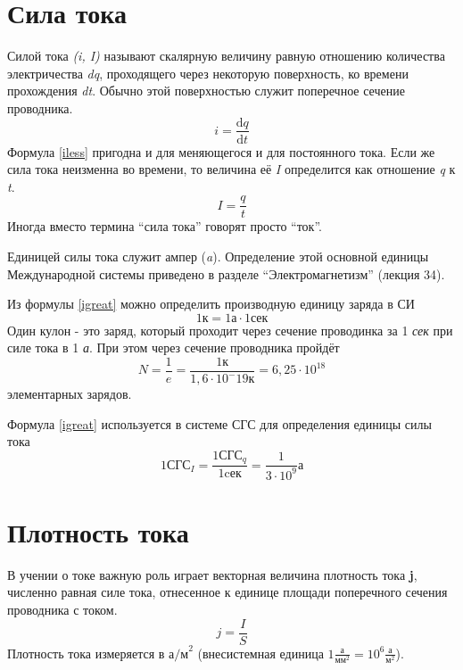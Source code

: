 \documentclass[a4paper,10pt]{book}
\begin{document}
\section{Сила тока}
Силой тока \emph{(i, I)} называют скалярную величину равную отношению количества электричества \emph{dq}, проходящего через некоторую
поверхность, ко времени прохождения \emph{dt}. Обычно этой поверхностью служит поперечное сечение проводника.
\begin{equation}\label{iless}
 i = \frac{\mathrm{d}q}{\mathrm{d}t}
\end{equation}
Формула \ref{iless} пригодна и для меняющегося и для постоянного тока. Если же сила тока неизменна во времени, то величина её \emph{I}
определится как отношение \emph{q} к \emph{t}.
\begin{equation}\label{igreat}
 I = \frac{q}{t}
\end{equation}
Иногда вместо термина ``сила тока'' говорят просто ``ток''.

Единицей силы тока служит ампер (\emph{a}). Определение этой основной единицы Международной системы приведено в разделе ``Электромагнетизм''
(лекция 34).

Из формулы \ref{igreat} можно определить производную единицу заряда в СИ
\begin{equation}
 1 \text{к} = 1 \text{а} \cdot 1 \text{сек} \nonumber
\end{equation}
Один кулон - это заряд, который проходит через сечение проводинка за 1 \emph{сек} при силе тока в 1 \emph{а}. При этом через сечение проводника
пройдёт 
\begin{equation}
 N = \frac{1}{e} = \frac{1 \text{к}}{1,6 \cdot 10^-19 \text{к}} = 6,25 \cdot 10^18 \nonumber
\end{equation}
элементарных зарядов.

Формула \ref{igreat} используется в системе СГС для определения единицы силы тока
\begin{equation}\label{sgsamp}
  1\text{СГС}_I = \frac{1\text{СГС}_q}{1 \text{cек}} = \frac{1}{3 \cdot 10^9} \text{а}
\end{equation}
\section{Плотность тока}
В учении о токе важную роль играет векторная величина плотность тока \textbf{j}, численно равная силе тока, отнесенное к единице площади
поперечного сечения проводника с током.
\begin{equation}\label{ji}
 j = \frac{I}{S}
\end{equation}
Плотность тока измеряется в $\text{а/м}^2$ (внесистемная единица $1\frac{\text{а}}{\text{мм}^2} = 10^6\frac{\text{а}}{\text{м}^2}$).
\end{document}
